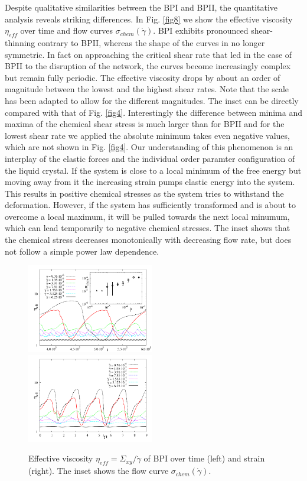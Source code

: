 \documentclass[aps,pre,onecolumn,groupedaddress]{revtex4-1}
\begin{document}
Despite qualitative similarities between the BPI and BPII, the quantitative analysis reveals striking differences.
In Fig. \ref{fig8} we show the effective viscosity $\eta_{eff}$ over time and flow curves $\sigma_{chem}(\dot{\gamma})$. 
BPI exhibits pronounced shear-thinning contrary to BPII, whereas the shape of the curves in no longer symmetric.
In fact on approaching the critical shear rate that led in the case of BPII to the disruption of the network, the curves become increasingly complex but remain fully periodic.
The effective viscosity drops by about an order of magnitude between the lowest and the highest shear rates.
Note that the scale has been adapted to allow for the different magnitudes.
The inset can be directly compared with that of Fig. \ref{fig4}.
Interestingly the difference between minima and maxima of the chemical shear stress is much larger than for BPII and for the lowest shear rate we applied the absolute minimum takes even negative values, which are not shown in Fig. \ref{fig4}.
Our understanding of this phenomenon is an interplay of the elastic forces and the individual order paramter configuration of the liquid crystal.
If the system is close to a local minimum of the free energy but moving away from it the increasing strain pumps elastic energy into the system. 
This results in positive chemical stresses as the system tries to withstand the deformation.
However, if the system has sufficiently transformed and is about to overcome a local maximum, it will be pulled towards the next local minumum, which can lead temporarily to negative chemical stresses. 
The inset shows that the chemical stress decreases monotonically with decreasing flow rate, but does not follow a simple power law dependence.
 
\begin{figure}[h]
\includegraphics[width=0.495\textwidth]{stress_bp1.pdf}
\includegraphics[width=0.495\textwidth]{stress_vs_strain_bp1.pdf}
\caption{Effective viscosity $\eta_{eff}=\Sigma_{xy}/\dot{\gamma}$ of BPI over time (left) and strain (right). The inset shows the flow curve $\sigma_{chem}(\dot{\gamma})$.}
\label{bp1-rheo}
\end{figure}
\end{document}
